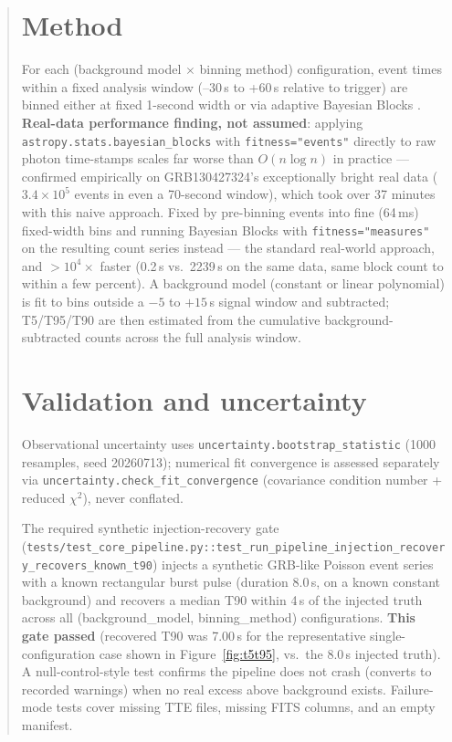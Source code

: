 \documentclass[11pt]{article}
\begin{document}
\begin{abstract}
\section{Method}
For each (background model $\times$ binning method) configuration, event
times within a fixed analysis window (--30\,s to +60\,s relative to trigger)
are binned either at fixed 1-second width or via adaptive Bayesian Blocks
\citep{Scargle2013BayesianBlocks}. \textbf{Real-data performance finding,
not assumed}: applying \texttt{astropy.stats.bayesian\_blocks} with
\texttt{fitness="events"} directly to raw photon time-stamps scales far
worse than $O(n\log n)$ in practice --- confirmed empirically on
GRB130427324's exceptionally bright real data ($3.4\times10^5$ events in
even a 70-second window), which took over 37 minutes with this naive
approach. Fixed by pre-binning events into fine (64\,ms) fixed-width bins
and running Bayesian Blocks with \texttt{fitness="measures"} on the
resulting count series instead --- the standard real-world approach, and
$>10^4\times$ faster (0.2\,s vs.\ 2239\,s on the same data, same block
count to within a few percent). A background model (constant or linear
polynomial) is fit to bins outside a $-5$ to $+15$\,s signal window and
subtracted; T5/T95/T90 are then estimated from the cumulative
background-subtracted counts across the full analysis window.

\section{Validation and uncertainty}
\label{sec:validation}
Observational uncertainty uses \texttt{uncertainty.bootstrap\_statistic}
(1000 resamples, seed 20260713); numerical fit convergence is assessed
separately via \texttt{uncertainty.check\_fit\_convergence} (covariance
condition number + reduced $\chi^2$), never conflated.

The required synthetic injection-recovery gate
(\texttt{tests/test\_core\_pipeline.py::test\_run\_pipeline\_injection\_recovery\_recovers\_known\_t90})
injects a synthetic GRB-like Poisson event series with a known rectangular
burst pulse (duration 8.0\,s, on a known constant background) and recovers
a median T90 within 4\,s of the injected truth across all
(background\_model, binning\_method) configurations. \textbf{This gate
passed} (recovered T90 was 7.00\,s for the representative single-configuration
case shown in Figure~\ref{fig:t5t95}, vs.\ the 8.0\,s injected truth). A
null-control-style test confirms the pipeline does not crash (converts to
recorded warnings) when no real excess above background exists. Failure-mode
tests cover missing TTE files, missing FITS columns, and an empty manifest.


\end{abstract}
\end{document}
